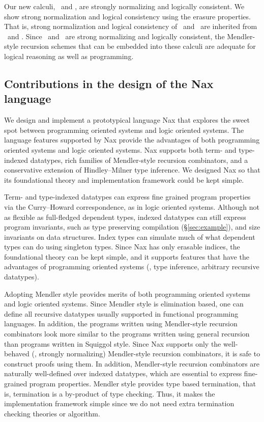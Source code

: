Our new calculi, \Fi\ and \Fixi, are strongly normalizing and
logically consistent. We show strong normalization and logical consistency
using the erasure properties. That is, strong normalization and
logical consistency of \Fi\ and \Fixi\ are inherited from \Fw\ and \Fixw.
Since \Fi\ and \Fixi\ are strong normalizing and logically  consistent,
the Mendler-style recursion schemes that can be embedded into these calculi
are adequate for logical reasoning as well as programming.

\subsection{Contributions in the design of the Nax language}
We design and implement a prototypical language Nax that explores
the sweet spot between programming oriented systems and logic oriented systems.
The language features supported by Nax provide the advantages
of both programming oriented systems and logic oriented systems.
Nax supports both term- and type-indexed datatypes,
rich families of Mendler-style recursion combinators,
and a conservative extension of Hindley--Milner type inference.
We designed Nax so that its foundational theory and
implementation framework could be kept simple.

Term- and type-indexed datatypes can express fine grained program properties
via the Curry--Howard correspondence, as in logic oriented systems. Although
not as flexible as full-fledged dependent types, indexed datatypes can
still express program invariants, such as type preserving compilation
(\S\ref{sec:example}), and size invariants on data structures.
Index types can simulate much of what
dependent types can do using singleton types. Since Nax has only erasable
indices, the foundational theory can be kept simple, and it supports
features that have the advantages of programming oriented systems 
(\eg, type inference, arbitrary recursive datatypes).

Adopting Mendler style provides merits of both programming oriented systems
and logic oriented systems. Since Mendler style is elimination based, one can
define all recursive datatypes usually supported in functional programming
languages. In addition, the programs written using Mendler-style recursion
combinators look more similar to the programs written using general recursion
than programs written in Squiggol style.
Since Nax supports only the well-behaved (\ie, strongly normalizing)
Mendler-style recursion combinators, it is safe to construct proofs using them.
In addition, Mendler-style recursion combinators are naturally well-defined
over indexed datatypes, which are essential to express fine-grained program
properties. Mendler style provides type based termination, that is, termination
is a by-product of type checking. Thus, it makes the implementation framework
simple since we do not need extra termination checking theories or algorithm.

